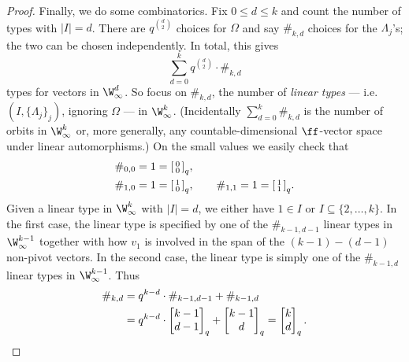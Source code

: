 \begin{proof}
    Finally, we do some combinatorics.
    Fix $0 \leq d \leq k$ and count the number of types with $|I| = d$.
    There are $q^{\binom{d}{2}}$ choices for $\Omega$ and say $\#_{k, d}$ choices for the $\Lambda_j$'s;
    the two can be chosen independently.
    In total, this gives
    \[ 
        \sum_{d=0}^k q^{\binom{d}{2}} \cdot \#_{k, d} 
    \]
    types for vectors in $\W_\infty^d$.
    So focus on $\#_{k, d}$, the number of \emph{linear types} --- i.e.~$(I, \{\Lambda_j\}_j)$, ignoring $\Omega$ --- in $\W_\infty^k$.
    (Incidentally $\sum_{d=0}^k \#_{k, d}$ is the number of orbits in $\W_\infty^k$ or, more generally, any countable-dimensional $\ff$-vector space under linear automorphisms.)
    On the small values we easily check that \begin{align*}
        &\#_{0, 0} = 1 = \begin{bsmallmatrix}0 \\ 0\end{bsmallmatrix}_q, \\
        &\#_{1, 0} = 1 = \begin{bsmallmatrix}1 \\ 0\end{bsmallmatrix}_q,\qquad
        \#_{1, 1} = 1 = \begin{bsmallmatrix}1 \\ 1\end{bsmallmatrix}_q.
    \end{align*}
    Given a linear type in $\W_\infty^k$ with $\vert I \vert = d$, 
    we either have $1 \in I$ or $I \subseteq \{2, \ldots, k\}$.
    In the first case, the linear type is specified by one of the $\#_{k-1, d-1}$ linear types in $\W_\infty^{k-1}$
    together with how $v_1$ is involved in the span of the $(k - 1) - (d - 1)$ non-pivot vectors.
    In the second case, the linear type is simply one of the $\#_{k-1, d}$ linear types in $\W_\infty^{k-1}$.
    Thus 
    \begin{align*}
        \#_{k, d} 
        &= q^{k-d} \cdot \#_{k-1, d-1} + \#_{k-1, d} \\
        &= q^{k-d} \cdot \begin{bmatrix}k-1 \\ d-1\end{bmatrix}_q + \begin{bmatrix}k-1 \\ d\end{bmatrix}_q
        = \begin{bmatrix}k \\ d\end{bmatrix}_q.
        \qedhere
    \end{align*}
\end{proof}

